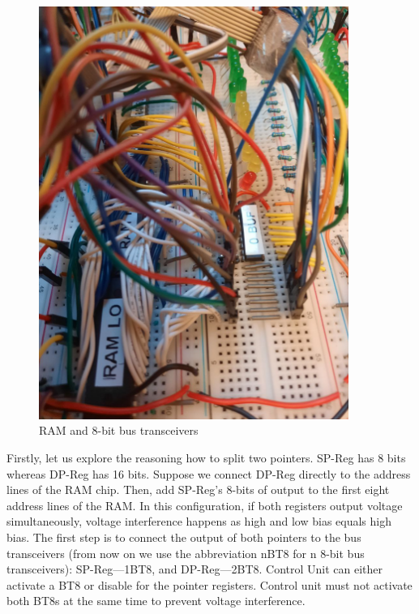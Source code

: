 \begin{figure}[H]
	\centering
	\includegraphics[width=0.9\textwidth]{img/ram_buffer}
	\caption{RAM and 8-bit bus transceivers}
	\label{fig:ram_buffer}
\end{figure}

Firstly, let us explore the reasoning how to split two pointers. SP-Reg has 8 bits whereas DP-Reg has 16 bits. Suppose we connect DP-Reg directly to the address lines of the RAM chip. Then, add SP-Reg's 8-bits of output to the first eight address lines of the RAM. In this configuration, if both registers output voltage simultaneously, voltage interference happens as high and low bias equals high bias. The first step is to connect the output of both pointers to the bus transceivers (from now on we use the abbreviation nBT8 for n 8-bit bus transceivers): SP-Reg---1BT8, and DP-Reg---2BT8. Control Unit can either activate a BT8 or disable for the pointer registers. Control unit must not activate both BT8s at the same time to prevent voltage interference.

